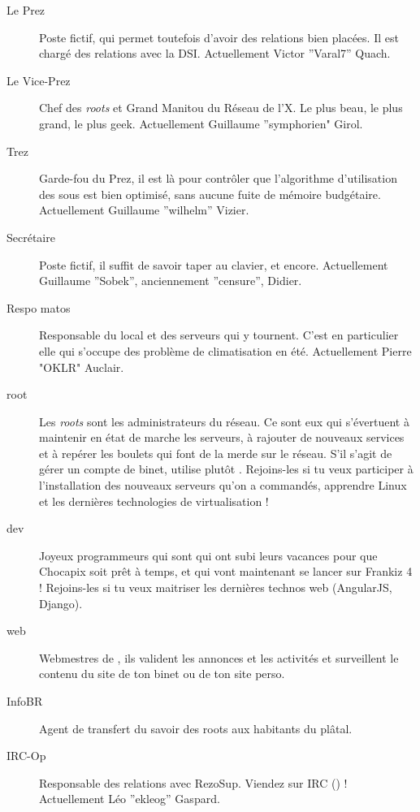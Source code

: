 \begin{description}

  \item[Le Prez]{Poste fictif, qui permet toutefois d'avoir des relations bien placées. Il est chargé des relations avec la DSI. Actuellement Victor ''Varal7'' Quach.}
  
  \item[Le Vice-Prez]{Chef des \emph{roots} et Grand Manitou du Réseau de l'X. Le plus beau, le plus grand, le plus geek. Actuellement Guillaume ''symphorien" Girol.}

  \item[Trez]{Garde-fou du Prez, il est là pour contrôler que l'algorithme d'utilisation des sous est bien optimisé, sans aucune fuite de mémoire budgétaire. Actuellement Guillaume ''wilhelm'' Vizier.}

  \item[Secrétaire]{Poste fictif, il suffit de savoir taper au clavier, et encore. Actuellement Guillaume ''Sobek'', anciennement ''censure'', Didier.}

 \item[Respo matos]{Responsable du local et des serveurs qui y tournent. C'est en particulier elle qui s'occupe des problème de climatisation en été. Actuellement Pierre "OKLR" Auclair.}

  \item[root]{Les \emph{roots} sont les administrateurs du réseau. Ce sont eux qui s'évertuent à maintenir en état de marche les serveurs, à rajouter de 
  nouveaux services et à repérer les boulets qui font de la merde sur le réseau. S'il s'agit de gérer un compte de binet, utilise plutôt . Rejoins-les si tu veux participer à l'installation des nouveaux serveurs qu'on a commandés, apprendre Linux et les dernières technologies de virtualisation !}
  \item[dev]{Joyeux programmeurs qui sont qui ont subi leurs vacances pour que Chocapix soit prêt à temps, et qui vont maintenant se lancer sur Frankiz 4 ! Rejoins-les si tu veux maitriser les dernières technos web (AngularJS, Django).}

  \item[web] {Webmestres de \fkz, ils valident les annonces et les activités et surveillent le contenu du site de ton binet ou de ton site perso.}

   \item[InfoBR]{Agent de transfert du savoir des roots aux habitants du plâtal.}



  \item[IRC-Op]{Responsable des relations avec RezoSup. Viendez sur IRC () ! \linebreak Actuellement Léo ''ekleog'' Gaspard.}




\end{description}

